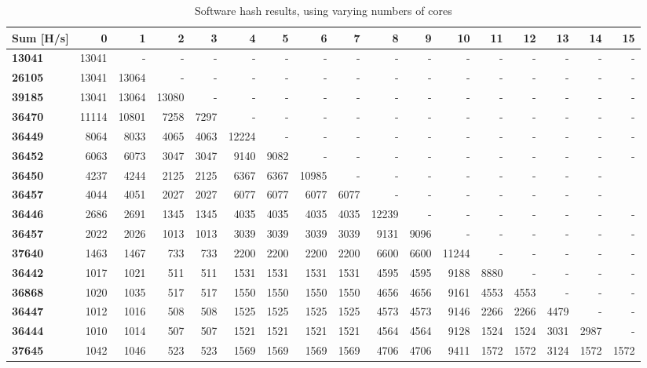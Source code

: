 \begin{table}
\tiny
\begin{tabular}{| l || r | r | r | r | r | r | r | r | r | r | r | r | r | r | r | r |}
  \hline 
  \textbf{Sum} [H/s] & \textbf{0} & \textbf{1} & \textbf{2} & \textbf{3} & \textbf{4} & \textbf{5} & \textbf{6} & \textbf{7} & \textbf{8} & \textbf{9} & \textbf{10} & \textbf{11} & \textbf{12} & \textbf{13} & \textbf{14} & \textbf{15}   \\
  \hline                       
  \textbf{13041} & 13041 & - & - & - & - & - & - & - & - & - & - & - & - & - & - & - \\
  \textbf{26105} & 13041 & 13064 & - & - & - & - & - & - & - & - & - & - & - & - & - & - \\
  \textbf{39185} & 13041 & 13064 & 13080 & - & - & - & - & - & - & - & - & - & - & - & - & - \\
  \textbf{36470} & 11114 & 10801 & 7258 & 7297 & - & - & - & - & - & - & - & - & - & - & - & - \\
  \textbf{36449} & 8064 & 8033 & 4065 & 4063 & 12224 & - & - & - & - & - & - & - & - & - & - & - \\
  \textbf{36452} & 6063 & 6073 & 3047 & 3047 & 9140 & 9082 & - & - & - & - & - & - & - & - & - & - \\
  \textbf{36450} & 4237 & 4244 & 2125 & 2125 & 6367 & 6367 & 10985 & - & - & - & - & - & - & - & -\\
  \textbf{36457} & 4044 & 4051 & 2027 & 2027 & 6077 & 6077 & 6077 & 6077 & - & - & - & - & - & - & - \\
  \textbf{36446} & 2686 & 2691 & 1345 & 1345 & 4035 & 4035 & 4035 & 4035 & 12239 & - & - & - & - & - & - & -\\
  \textbf{36457} & 2022 & 2026 & 1013 & 1013 & 3039 & 3039 & 3039 & 3039 & 9131 & 9096 & - & - & - & - & - & -\\
  \textbf{37640} & 1463 & 1467 & 733 & 733 & 2200 & 2200 & 2200 & 2200 & 6600 & 6600 & 11244 & - & - & - & - & -\\
  \textbf{36442} & 1017 & 1021 & 511 & 511 & 1531 & 1531 & 1531 & 1531 & 4595 & 4595 & 9188 & 8880 & - & - & - & -\\
  \textbf{36868} & 1020 & 1035 & 517 & 517 & 1550 & 1550 & 1550 & 1550 & 4656 & 4656 & 9161 & 4553 & 4553 & - & - & -\\
  \textbf{36447} & 1012 & 1016 & 508 & 508 & 1525 & 1525 & 1525 & 1525 & 4573 & 4573 & 9146 & 2266 & 2266 & 4479 & - & -\\
  \textbf{36444} & 1010 & 1014 & 507 & 507 & 1521 & 1521 & 1521 & 1521 & 4564 & 4564 & 9128 & 1524 & 1524 & 3031 & 2987 & -\\
  \textbf{37645} & 1042 & 1046 & 523 & 523 & 1569 & 1569 & 1569 & 1569 & 4706 & 4706 & 9411 & 1572 & 1572 & 3124 & 1572 & 1572\\
  \hline  
\end{tabular}
\caption{Software hash results, using varying numbers of cores}
\label{tab:Perf-SW}
\end{table}

